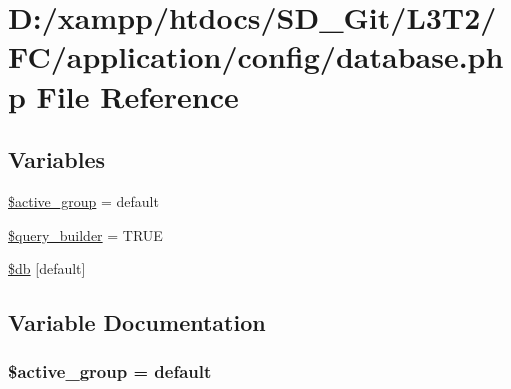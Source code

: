 \hypertarget{database_8php}{}\section{D\+:/xampp/htdocs/\+S\+D\+\_\+\+Git/\+L3\+T2/\+F\+C/application/config/database.php File Reference}
\label{database_8php}
\subsection*{Variables}
\begin{DoxyCompactItemize}
\item 
\hyperlink{database_8php_a5046ea83a698c5b7bbf6ffd3dd816b65}{\$active\+\_\+group} = \textquotesingle{}default\textquotesingle{}
\item 
\hyperlink{database_8php_a11d000bc34a3940bb236487b672328bf}{\$query\+\_\+builder} = T\+R\+U\+E
\item 
\hyperlink{database_8php_ad0fb5aa377966ebea235874ccab61f40}{\$db} \mbox{[}\textquotesingle{}default\textquotesingle{}\mbox{]}
\end{DoxyCompactItemize}


\subsection{Variable Documentation}
\hypertarget{database_8php_a5046ea83a698c5b7bbf6ffd3dd816b65}{}
\subsubsection[{\$active\+\_\+group}]{\setlength{\rightskip}{0pt plus 5cm}\$active\+\_\+group = \textquotesingle{}default\textquotesingle{}}\label{database_8php_a5046ea83a698c5b7bbf6ffd3dd816b65}
\hypertarget{database_8php_ad0fb5aa377966ebea235874ccab61f40}{}
